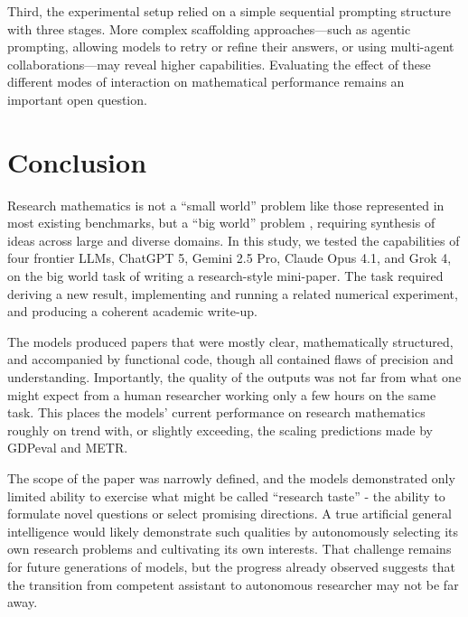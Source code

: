 \documentclass[11pt]{article}
\begin{document}
Third, the experimental setup relied on a simple sequential prompting structure with three stages. More complex scaffolding approaches—such as agentic prompting, allowing models to retry or refine their answers, or using multi-agent collaborations—may reveal higher capabilities. Evaluating the effect of these different modes of interaction on mathematical performance remains an important open question.  

\section{Conclusion}

Research mathematics is not a ``small world'' problem like those represented in most existing benchmarks, but a ``big world'' problem \cite{javed2024}, requiring synthesis of ideas across large and diverse domains. In this study, we tested the capabilities of four frontier LLMs, ChatGPT 5, Gemini 2.5 Pro, Claude Opus 4.1, and Grok 4, on the big world task of writing a research-style mini-paper. The task required deriving a new result, implementing and running a related numerical experiment, and producing a coherent academic write-up. 

The models produced papers that were mostly clear, mathematically structured, and accompanied by functional code, though all contained flaws of precision and understanding. Importantly, the quality of the outputs was not far from what one might expect from a human researcher working only a few hours on the same task. This places the models’ current performance on research mathematics roughly on trend with, or slightly exceeding, the scaling predictions made by GDPeval and METR.  

The scope of the paper was narrowly defined, and the models demonstrated only limited ability to exercise what might be called ``research taste'' - the ability to formulate novel questions or select promising directions. A true artificial general intelligence would likely demonstrate such qualities by autonomously selecting its own research problems and cultivating its own interests. That challenge remains for future generations of models, but the progress already observed suggests that the transition from competent assistant to autonomous researcher may not be far away.




\end{document}
